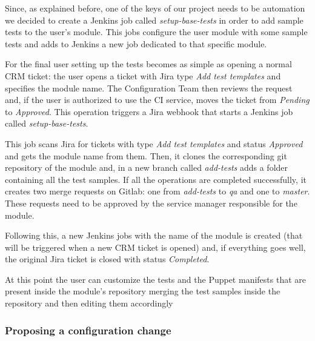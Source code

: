 Since, as explained before, one of the keys of our project needs to be
automation we decided to create a Jenkins job called
\textit{setup-base-tests} in order to add sample tests to the user's
module. This jobs configure the user module with some sample tests and
adds to Jenkins a new job dedicated to that specific module.

For the final user setting up the tests becomes as simple as opening
a normal CRM ticket: the user opens a ticket with Jira type \textit{Add
test templates} and specifies the module name. The Configuration Team then
reviews the request and, if the user is authorized to use the CI service,
moves the ticket from \textit{Pending} to \textit{Approved}. This
operation triggers a Jira webhook that starts a Jenkins job called
\textit{setup-base-tests}.

This job scans Jira for tickets with type \textit{Add test templates} and
status \textit{Approved} and gets the module name from them. Then, it
clones the corresponding git repository of the module and, in a new branch
called \textit{add-tests} adds a folder containing all the test samples.
If all the operations are completed successfully, it creates two merge
requests on Gitlab: one from \textit{add-tests} to \textit{qa} and one to
\textit{master}. These requests need to be approved by the service manager
responsible for the module.

Following this, a new Jenkins jobs with the name of the module is created
(that will be triggered when a new CRM ticket is opened) and, if
everything goes well, the original Jira ticket is closed with status
\textit{Completed}. 

At this point the user can customize the tests and the Puppet manifests
that are present inside the module's repository merging the test samples
inside the repository and then editing them accordingly 

\subsubsection{Proposing a configuration change}
